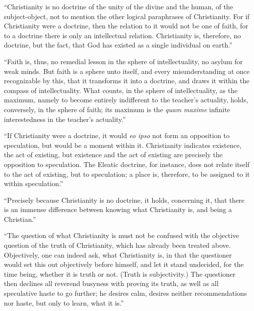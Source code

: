 \documentclass[12pt]{book}
\begin{document}
``Christianity is no doctrine of the unity of the divine and the human, of the subject-object, not to mention the other logical paraphrases of Christianity. For if Christianity were a doctrine, then the relation to it would not be one of faith, for to a doctrine there is only an intellectual relation. Christianity is, therefore, no doctrine, but the fact, that God has existed as a single individual on earth.''

``Faith is, thus, no remedial lesson in the sphere of intellectuality, no asylum for weak minds. But faith is a sphere unto itself, and every misunderstanding at once recognizable by this, that it transforms it into a doctrine, and draws it within the compass of intellectuality. What counts, in the sphere of intellectuality, as the maximum, namely to become entirely indifferent to the teacher's actuality, holds, conversely, in the sphere of faith; its maximum is the \textit{quam maxime} infinite interestedness in the teacher's actuality.''

``If Christianity were a doctrine, it would \textit{eo ipso} not form an opposition to speculation, but would be a moment within it. Christianity indicates existence, the act of existing, but existence and the act of existing are precisely the opposition to speculation. The Eleatic doctrine, for instance, does not relate itself to the act of existing, but to speculation; a place is, therefore, to be assigned to it within speculation.''

``Precisely because Christianity is no doctrine, it holds, concerning it, that there is an immense difference between knowing what Christianity is, and being a Christian.''

``The question of what Christianity is must not be confused with the objective question of the truth of Christianity, which has already been treated above. Objectively, one can indeed ask, what Christianity is, in that the questioner would set this out objectively before himself, and let it stand undecided, for the time being, whether it is
truth or not. (Truth is subjectivity.) The questioner then declines all reverend busyness with proving its truth, as well as all speculative haste to go further; he desires calm, desires neither recommendations nor haste, but only to learn, what it is.''
\end{document}
